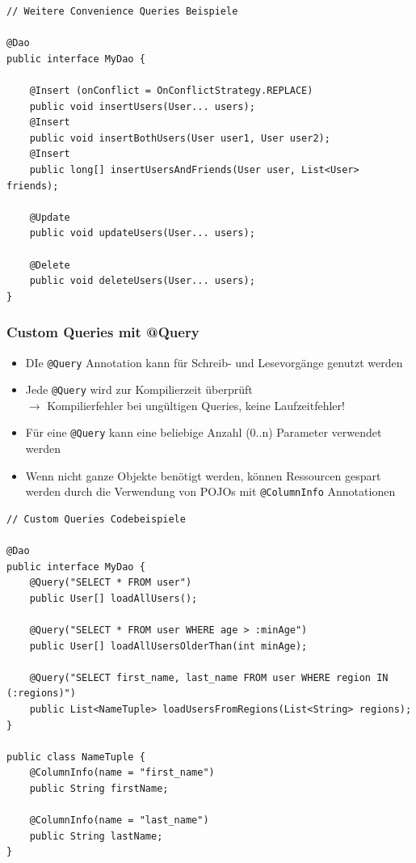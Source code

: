 \documentclass[a4paper]{article}
\begin{document}
\begin{lstlisting}
// Weitere Convenience Queries Beispiele

@Dao
public interface MyDao {

	@Insert (onConflict = OnConflictStrategy.REPLACE)
	public void insertUsers(User... users);
	@Insert
	public void insertBothUsers(User user1, User user2);
	@Insert
	public long[] insertUsersAndFriends(User user, List<User> friends);
	
	@Update
	public void updateUsers(User... users);
	
	@Delete
	public void deleteUsers(User... users);
}	
\end{lstlisting}

\newpage

\subsubsection{Custom Queries mit @Query}

\begin{itemize}
	\item DIe \texttt{@Query} Annotation kann für Schreib- und Lesevorgänge genutzt werden
	\item Jede \texttt{@Query} wird zur Kompilierzeit überprüft\\
	$\rightarrow$ Kompilierfehler bei ungültigen Queries, keine Laufzeitfehler!
	\item Für eine \texttt{@Query} kann eine beliebige Anzahl (0..n) Parameter verwendet werden
	\item Wenn nicht ganze Objekte benötigt werden, können Ressourcen gespart werden durch die Verwendung von POJOs mit \texttt{@ColumnInfo} Annotationen
\end{itemize}

\begin{lstlisting}
// Custom Queries Codebeispiele

@Dao 
public interface MyDao { 
	@Query("SELECT * FROM user") 
	public User[] loadAllUsers();

	@Query("SELECT * FROM user WHERE age > :minAge") 
	public User[] loadAllUsersOlderThan(int minAge);

	@Query("SELECT first_name, last_name FROM user WHERE region IN (:regions)") 
	public List<NameTuple> loadUsersFromRegions(List<String> regions); 
}

public class NameTuple { 
	@ColumnInfo(name = "first_name") 
	public String firstName;

	@ColumnInfo(name = "last_name") 
	public String lastName; 
}
\end{lstlisting}
\end{document}
